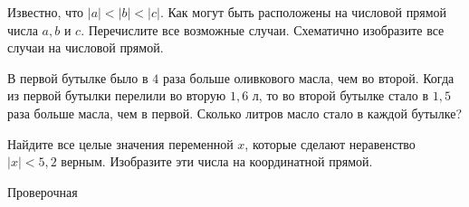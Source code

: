 \begin{class}[number=7-8]
\begin{listofex}
		\item Известно, что \( |a|<|b|<|c| \). Как могут быть расположены на числовой прямой числа \(a, b\) и \(c\). Перечислите все возможные случаи. Схематично изобразите все случаи на числовой прямой.
		\item В первой бутылке было в \(4\) раза больше оливкового масла, чем во второй. Когда из первой бутылки перелили во вторую \(1,6\) л, то во второй бутылке стало в \(1,5\) раза больше масла, чем в первой. Сколько литров масло стало в каждой бутылке?
		\item Найдите все целые значения переменной \(x\), которые сделают неравенство \(|x| < 5,2\) верным. Изобразите эти числа на координатной прямой.
	\end{listofex}
\end{class}

\begin{exam}
	\begin{listofex}
		\item Проверочная
	\end{listofex}
\end{exam}
